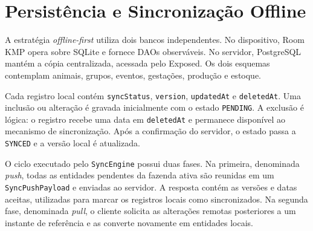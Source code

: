\section{Persistência e Sincronização Offline}
\label{sec:desenvolvimento-persistencia}

A estratégia \textit{offline-first} utiliza dois bancos independentes. No dispositivo, Room KMP opera sobre SQLite e fornece DAOs observáveis. No servidor, PostgreSQL mantém a cópia centralizada, acessada pelo Exposed. Os dois esquemas contemplam animais, grupos, eventos, gestações, produção e estoque.

Cada registro local contém \texttt{syncStatus}, \texttt{version}, \texttt{updatedAt} e \texttt{deletedAt}. Uma inclusão ou alteração é gravada inicialmente com o estado \texttt{PENDING}. A exclusão é lógica: o registro recebe uma data em \texttt{deletedAt} e permanece disponível ao mecanismo de sincronização. Após a confirmação do servidor, o estado passa a \texttt{SYNCED} e a versão local é atualizada.

O ciclo executado pelo \texttt{SyncEngine} possui duas fases. Na primeira, denominada \textit{push}, todas as entidades pendentes da fazenda ativa são reunidas em um \texttt{SyncPushPayload} e enviadas ao servidor. A resposta contém as versões e datas aceitas, utilizadas para marcar os registros locais como sincronizados. Na segunda fase, denominada \textit{pull}, o cliente solicita as alterações remotas posteriores a um instante de referência e as converte novamente em entidades locais.

\begin{figure}[htb]
    \centering
\end{figure}


